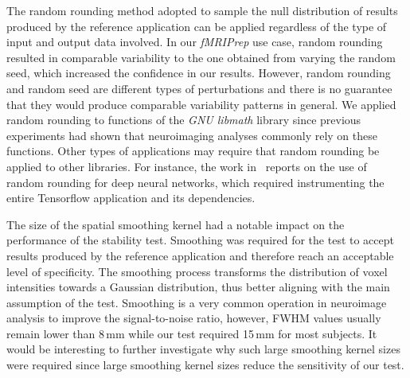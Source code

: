 \documentclass[lettersize,journal]{IEEEtran}
\newcommand{\fmriprep}{\emph{fMRIPrep}\xspace}
\begin{document}
{%
The random rounding method adopted to sample the null distribution of results produced by the reference application can be applied regardless of the type of input and output data involved. In our \fmriprep use case, random rounding resulted in comparable variability to the one obtained from varying the random seed, which increased the confidence in our results. However, random rounding and random seed are different types of perturbations and there is no guarantee that they would produce comparable variability patterns in general. We applied random rounding to functions of the \emph{GNU libmath} library since previous experiments had shown that neuroimaging analyses commonly rely on these functions. Other types of applications may require that random rounding be applied to other libraries. For instance, the work in~\cite{pepe2022numerical} reports on the use of random rounding for deep neural networks, which required instrumenting the entire Tensorflow application and its dependencies.

The size of the spatial smoothing kernel had a notable impact on the performance of the stability test. Smoothing was required for the test to accept results produced by the reference application and therefore reach an acceptable level of specificity.
The smoothing process transforms the distribution of voxel intensities towards a Gaussian distribution, thus better aligning with the main assumption of the test.
Smoothing is a very common operation in neuroimage analysis to improve the signal-to-noise ratio, however, FWHM values usually remain lower than 8\,mm while our test required 15\,mm for most subjects. It would be interesting to further investigate why such large smoothing kernel sizes were required since large smoothing kernel sizes reduce the sensitivity of our test.

}
\end{document}
